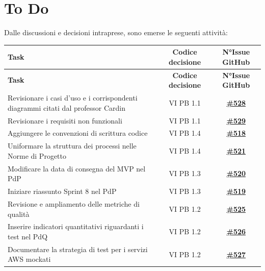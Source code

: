 \documentclass[a4paper,12pt]{article}
\newcommand{\ignoreglossary}{}
\begin{document}
\section{To Do}
Dalle discussioni e decisioni intraprese, sono emerse le seguenti attività:
\small
\renewcommand{\arraystretch}{1.2}
\begin{longtable}{|>{\raggedright\arraybackslash}p{}|c|c|}
\hline
\rowcolor{gray!60}
\textbf{Task} & \textbf{Codice decisione} & \textbf{N°Issue GitHub} \\
\hline
\endfirsthead
\hline
\rowcolor{gray!60}
\textbf{Task} & \textbf{Codice decisione} & \textbf{N°Issue GitHub} \\
\hline
\endhead
\endfoot
\hline
\endlastfoot
\rowcolor{white}
Revisionare i casi d'uso e i corrispondenti diagrammi citati dal professor Cardin & VI \ignoreglossary{PB} 1.1 & \href{https://github.com/SWE-BitByBit/SWE-docs/issues/528}{\textbf{\#528}} \\
\hline
\rowcolor{gray!20}
Revisionare i requisiti non funzionali & VI \ignoreglossary{PB} 1.1 & \href{https://github.com/SWE-BitByBit/SWE-docs/issues/529}{\textbf{\#529}} \\
\hline
\rowcolor{white}
Aggiungere le convenzioni di scrittura codice & VI \ignoreglossary{PB} 1.4 & \href{https://github.com/SWE-BitByBit/SWE-docs/issues/518}{\textbf{\#518}} \\
\hline
\rowcolor{gray!20}
Uniformare la struttura dei processi nelle Norme di Progetto & VI \ignoreglossary{PB} 1.4 & \href{https://github.com/SWE-BitByBit/SWE-docs/issues/521}{\textbf{\#521}} \\
\hline
\rowcolor{white}
Modificare la data di consegna del MVP nel PdP & VI \ignoreglossary{PB} 1.3 & \href{https://github.com/SWE-BitByBit/SWE-docs/issues/520}{\textbf{\#520}} \\
\hline
\rowcolor{gray!20}
Iniziare riassunto Sprint 8 nel PdP & VI \ignoreglossary{PB} 1.3 & \href{https://github.com/SWE-BitByBit/SWE-docs/issues/519}{\textbf{\#519}} \\
\hline
\rowcolor{white}
Revisione e ampliamento delle metriche di qualità & VI \ignoreglossary{PB} 1.2 & \href{https://github.com/SWE-BitByBit/SWE-docs/issues/525}{\textbf{\#525}} \\
\hline
\rowcolor{gray!20}
Inserire indicatori quantitativi riguardanti i test nel PdQ & VI \ignoreglossary{PB} 1.2 & \href{https://github.com/SWE-BitByBit/SWE-docs/issues/526}{\textbf{\#526}} \\
\hline
\rowcolor{white}
Documentare la strategia di test per i servizi AWS mockati & VI \ignoreglossary{PB} 1.2 & \href{https://github.com/SWE-BitByBit/SWE-docs/issues/527}{\textbf{\#527}} \\

\end{longtable}
\end{document}
